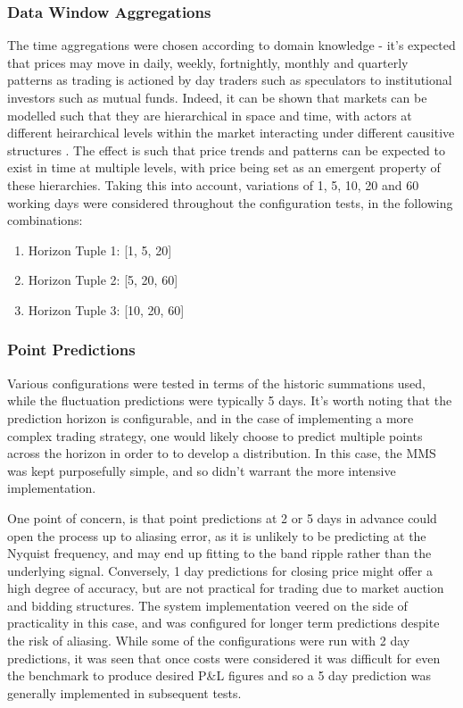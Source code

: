 \documentclass[a4paper,11pt,oneside]{article}
\theoremstyle{plain}
\theoremstyle{definition}
\begin{document}
	\subsubsection{Data Window Aggregations} The time aggregations were chosen according to domain knowledge - it's expected that prices may move in daily, weekly, fortnightly, monthly and quarterly patterns as trading is actioned by day traders such as speculators to institutional investors such as mutual funds. Indeed, it can be shown that markets can be modelled such that they are hierarchical in space and time, with actors at different heirarchical levels within the market interacting under different causitive structures \citep{Wilcox}. The effect is such that price trends and patterns can be expected to exist in time at multiple levels, with price being set as an emergent property of these hierarchies. Taking this into account, variations of 1, 5, 10, 20 and 60 working days were considered throughout the configuration tests, in the following combinations:  
	\begin{enumerate}
		\item Horizon Tuple 1: [1, 5, 20]
		\item Horizon Tuple 2: [5, 20, 60]
		\item Horizon Tuple 3: [10, 20, 60]
	\end{enumerate}
	
	\subsubsection {Point Predictions} Various configurations were tested in terms of the historic summations used, while the fluctuation predictions were typically 5 days. It's worth noting that the prediction horizon is configurable, and in the case of implementing a more complex trading strategy, one would likely choose to predict multiple points across the horizon in order to to develop a distribution. In this case, the MMS was kept purposefully simple, and so didn't warrant the more intensive implementation. \newline
	
	One point of concern, is that point predictions at 2 or 5 days in advance could open the process up to aliasing error, as it is unlikely to be predicting at the Nyquist frequency, and may end up fitting to the band ripple rather than the underlying signal. Conversely, 1 day predictions for closing price might offer a high degree of accuracy, but are not practical for trading due to market auction and bidding structures. The system implementation veered on the side of practicality in this case, and was configured for longer term predictions despite the risk of aliasing. While some of the configurations were run with 2 day predictions, it was seen that once costs were considered it was difficult for even the benchmark to produce desired P\&L figures and so a 5 day prediction was generally implemented in subsequent tests.
	
\end{document}
